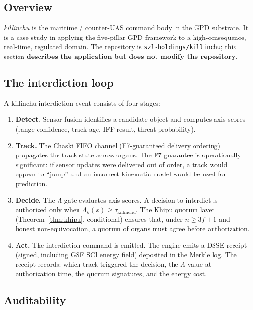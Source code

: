 \documentclass[11pt,letterpaper]{article}
\theoremstyle{definition}
\newcommand{\Lam}{\Lambda}
\begin{document}
\subsection{Overview}

\emph{killinchu} is the maritime / counter-UAS command body in the GPD substrate.
It is a case study in applying the five-pillar GPD framework to a
high-consequence, real-time, regulated domain.  The repository is
\texttt{szl-holdings/killinchu}; this section \textbf{describes the application
but does not modify the repository}.

\subsection{The interdiction loop}

A killinchu interdiction event consists of four stages:
\begin{enumerate}
\item \textbf{Detect.}  Sensor fusion identifies a candidate object and computes
  axis scores (range confidence, track age, IFF result, threat probability).
\item \textbf{Track.}  The Chaski FIFO channel (F7-guaranteed delivery ordering)
  propagates the track state across organs.  The F7 guarantee is operationally
  significant: if sensor updates were delivered out of order, a track would
  appear to ``jump'' and an incorrect kinematic model would be used for
  prediction.
\item \textbf{Decide.}  The $\Lam$-gate evaluates axis scores.  A decision to
  interdict is authorized only when $\Lam_k(x) \ge \tau_{\text{killinchu}}$.
  The Khipu quorum layer (Theorem~\ref{thm:khipu}, conditional) ensures that,
  under $n \ge 3f+1$ and honest non-equivocation, a quorum of organs must agree
  before authorization.
\item \textbf{Act.}  The interdiction command is emitted.  The engine emits a
  DSSE receipt (signed, including GSF SCI energy field) deposited in the Merkle
  log.  The receipt records: which track triggered the decision, the $\Lam$ value
  at authorization time, the quorum signatures, and the energy cost.
\end{enumerate}

\subsection{Auditability}
\end{document}

